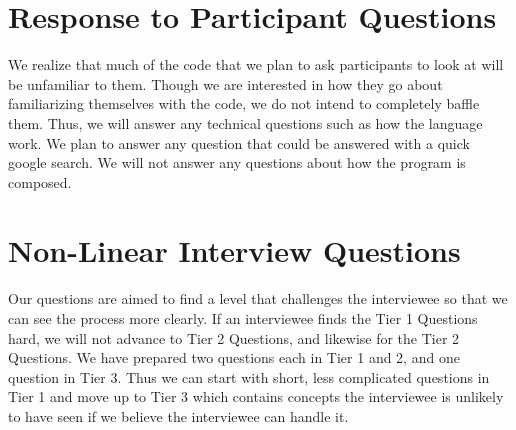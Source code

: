 \documentclass{article}
\begin{document}
\section{Response to Participant Questions}
We realize that much of the code that we plan to ask participants to look at will be unfamiliar to them. Though we are interested in how they go about familiarizing themselves with the code, we do not intend to completely baffle them. Thus, we will answer any technical questions such as how the language work. We plan to answer any question that could be answered with a quick google search. We will not answer any questions about how the program is composed.



\section{Non-Linear Interview Questions}
Our questions are aimed to find a level that challenges the interviewee so that we can see the process more clearly. If an interviewee finds the Tier 1 Questions hard, we will not advance to Tier 2 Questions, and likewise for the Tier 2 Questions. We have prepared two questions each in Tier 1 and 2, and one question in Tier 3. Thus we can start with short, less complicated questions in Tier 1 and move up to Tier 3 which contains concepts the interviewee is unlikely to have seen if we believe the interviewee can handle it.
\end{document}

